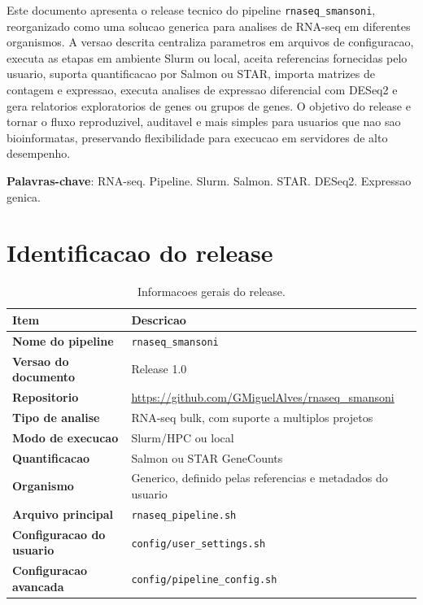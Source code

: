 \documentclass[
  12pt,
  oneside,
  a4paper,
  chapter=TITLE,
  section=TITLE,
  brazil
]{abntex2}
\newcommand{\pipelineversion}{Release 1.0}
\newcommand{\repositoryurl}{\url{https://github.com/GMiguelAlves/rnaseq_smansoni}}
\begin{document}
\OnehalfSpacing

\imprimircapa
\imprimirfolhaderosto

\begin{resumo}
Este documento apresenta o release tecnico do pipeline \texttt{rnaseq\_smansoni}, reorganizado como uma solucao generica para analises de RNA-seq em diferentes organismos. A versao descrita centraliza parametros em arquivos de configuracao, executa as etapas em ambiente Slurm ou local, aceita referencias fornecidas pelo usuario, suporta quantificacao por Salmon ou STAR, importa matrizes de contagem e expressao, executa analises de expressao diferencial com DESeq2 e gera relatorios exploratorios de genes ou grupos de genes. O objetivo do release e tornar o fluxo reproduzivel, auditavel e mais simples para usuarios que nao sao bioinformatas, preservando flexibilidade para execucao em servidores de alto desempenho.

\textbf{Palavras-chave}: RNA-seq. Pipeline. Slurm. Salmon. STAR. DESeq2. Expressao genica.
\end{resumo}

\tableofcontents*
\cleardoublepage

\chapter{Identificacao do release}

\begin{table}[htbp]
\centering
\caption{Informacoes gerais do release.}
\begin{tabular}{>{\bfseries}p{}p{}}
\toprule
Item & Descricao \\
\midrule
Nome do pipeline & \texttt{rnaseq\_smansoni} \\
Versao do documento & \pipelineversion \\
Repositorio & \repositoryurl \\
Tipo de analise & RNA-seq bulk, com suporte a multiplos projetos \\
Modo de execucao & Slurm/HPC ou local \\
Quantificacao & Salmon ou STAR GeneCounts \\
Organismo & Generico, definido pelas referencias e metadados do usuario \\
Arquivo principal & \texttt{rnaseq\_pipeline.sh} \\
Configuracao do usuario & \texttt{config/user\_settings.sh} \\
Configuracao avancada & \texttt{config/pipeline\_config.sh} \\
\bottomrule
\end{tabular}
\end{table}
\end{document}
